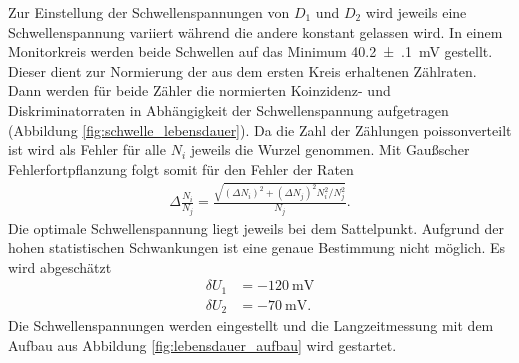 Zur Einstellung der Schwellenspannungen von $D_1$ und $D_2$ wird jeweils eine Schwellenspannung variiert während die andere konstant gelassen wird. In einem Monitorkreis werden beide Schwellen auf das Minimum \SI[separate-uncertainty = true]{40.2(1)}{\milli\volt} gestellt. Dieser dient zur Normierung der aus dem ersten Kreis erhaltenen Zählraten. Dann werden für beide Zähler die normierten Koinzidenz- und Diskriminatorraten in Abhängigkeit der Schwellenspannung aufgetragen (Abbildung \ref{fig:schwelle_lebensdauer}). Da die Zahl der Zählungen poissonverteilt ist wird als Fehler für alle $N_i$ jeweils die Wurzel genommen. Mit Gaußscher Fehlerfortpflanzung folgt somit für den Fehler der Raten 
\begin{align*}
  \Delta \frac{N_i}{N_j}=\frac{\sqrt{(\Delta N_i)^2+(\Delta N_j)^2N_i^2/N_j^2}}{N_j}.
\end{align*} 
Die optimale Schwellenspannung liegt jeweils bei dem Sattelpunkt. Aufgrund der hohen statistischen Schwankungen ist eine genaue Bestimmung nicht möglich. Es wird abgeschätzt
\begin{align*}
  \delta U_1&=-\SI{120}{\milli\volt}\\
  \delta U_2&=-\SI{70}{\milli\volt}.
\end{align*} 
Die Schwellenspannungen werden eingestellt und die Langzeitmessung mit dem Aufbau aus Abbildung \ref{fig:lebensdauer_aufbau} wird gestartet.

\newpage


